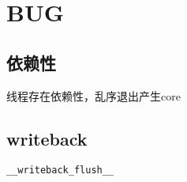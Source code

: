 \chapter{BUG}

\section{依赖性}

\begin{enumbox}
\item 线程存在依赖性，乱序退出产生core
\end{enumbox}

\section{writeback}

\verb|__writeback_flush__|
